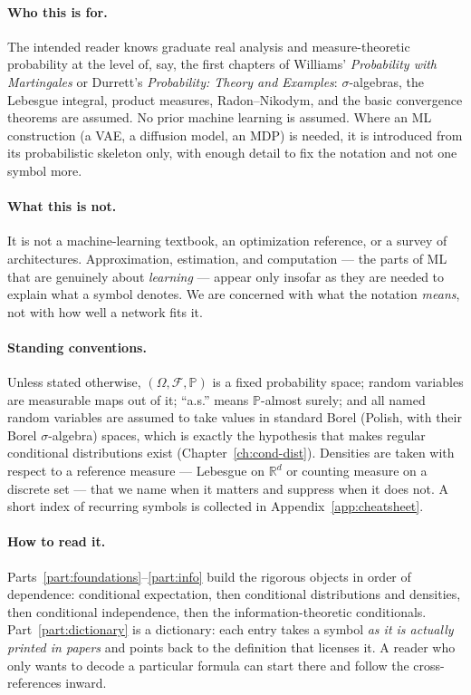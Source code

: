 \documentclass[11pt,oneside]{report}
\theoremstyle{plain}
\theoremstyle{definition}
\theoremstyle{remark}
\newcommand{\R}{\mathbb{R}}
\newcommand{\Prob}{\mathbb{P}}
\newcommand{\Fcal}{\mathcal{F}}
\numberwithin{equation}{chapter}
\begin{document}
\paragraph{Who this is for.}
The intended reader knows graduate real analysis and measure-theoretic
probability at the level of, say, the first chapters of Williams'
\emph{Probability with Martingales} or Durrett's \emph{Probability:
Theory and Examples}: $\sigma$-algebras, the Lebesgue integral, product
measures, Radon--Nikodym, and the basic convergence theorems are assumed.
No prior machine learning is assumed. Where an ML construction (a VAE, a
diffusion model, an MDP) is needed, it is introduced from its probabilistic
skeleton only, with enough detail to fix the notation and not one symbol more.

\paragraph{What this is not.}
It is not a machine-learning textbook, an optimization reference, or a
survey of architectures. Approximation, estimation, and computation ---
the parts of ML that are genuinely about \emph{learning} --- appear only
insofar as they are needed to explain what a symbol denotes. We are
concerned with what the notation \emph{means}, not with how well a network
fits it.

\paragraph{Standing conventions.}
Unless stated otherwise, $(\Omega,\Fcal,\Prob)$ is a fixed probability
space; random variables are measurable maps out of it; ``a.s.'' means
$\Prob$-almost surely; and all named random variables are assumed to take
values in standard Borel (Polish, with their Borel $\sigma$-algebra)
spaces, which is exactly the hypothesis that makes regular conditional
distributions exist (Chapter~\ref{ch:cond-dist}). Densities are taken with
respect to a reference measure --- Lebesgue on $\R^d$ or counting measure
on a discrete set --- that we name when it matters and suppress when it
does not. A short index of recurring symbols is collected in
Appendix~\ref{app:cheatsheet}.

\paragraph{How to read it.}
Parts~\ref{part:foundations}--\ref{part:info} build the rigorous objects
in order of dependence: conditional expectation, then conditional
distributions and densities, then conditional independence, then the
information-theoretic conditionals. Part~\ref{part:dictionary} is a
dictionary: each entry takes a symbol \emph{as it is actually printed in
papers} and points back to the definition that licenses it. A reader who
only wants to decode a particular formula can start there and follow the
cross-references inward.
\end{document}
